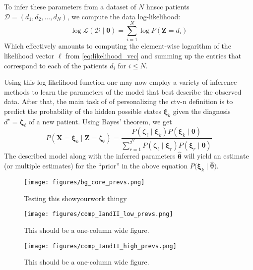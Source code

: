 \documentclass[twocolumn]{aastex631}
\begin{document}
To infer these parameters from a dataset of $N$ \gls{hnscc} patients $\boldsymbol{\mathcal{D}} = \left( d_1, d_2, \ldots, d_N \right)$, we compute the data log-likelihood:
%
\begin{equation}
    \log\mathcal{L} \left( \boldsymbol{\mathcal{D}} \mid \boldsymbol{\theta} \right) = \sum_{i=1}^N \log P \left( \mathbf{Z} = d_i \right)
\end{equation}
%
Which effectively amounts to computing the element-wise logarithm of the likelihood vector $\boldsymbol{\ell}$ from \cref{eq:likelihood_vec} and summing up the entries that correspond to each of the patients $d_i$ for $i\leq N$. 

Using this log-likelihood function one may now employ a variety of inference methods to learn the parameters of the model that best describe the observed data. After that, the main task of of personalizing the \gls{ctv-n} definition is to predict the probability of the hidden possible states $\boldsymbol{\xi}_k$ given the diagnosis $d^\star=\boldsymbol{\zeta}_\ell$ of a new patient. Using Bayes' theorem, we get
%
\begin{equation}
    P\left( \mathbf{X}=\boldsymbol{\xi}_k \mid \mathbf{Z}=\boldsymbol{\zeta}_\ell \right) = \frac{P\left( \boldsymbol{\zeta}_\ell \mid \boldsymbol{\xi}_k \right) P\left( \boldsymbol{\xi}_k \mid \boldsymbol{\theta} \right)}{\sum_{r=1}^{2^V} P\left( \boldsymbol{\zeta}_\ell \mid \boldsymbol{\xi}_r \right) P\left( \boldsymbol{\xi}_r \mid \boldsymbol{\theta} \right) }
\end{equation}
%
The described model along with the inferred parameters $\boldsymbol{\hat{\theta}}$ will yield an estimate (or multiple estimates) for the ``prior'' in the above equation $P\big( \boldsymbol{\xi}_k \mid \boldsymbol{\hat{\theta}} \big)$.

\begin{figure*}
    \begin{centering}
        \texttt{[image: figures/bg\_core\_prevs.png]}
        \caption{Testing this showyourwork thingy}
        \label{fig:bg_prevalences}
    \end{centering}
\end{figure*}

\begin{figure}
    \begin{centering}
        \texttt{[image: figures/comp\_IandII\_low\_prevs.png]}
        \caption{This should be a one-column wide figure.}
        \label{fig:IandII_low_prevs}
    \end{centering}
\end{figure}

\begin{figure}
    \begin{centering}
        \texttt{[image: figures/comp\_IandII\_high\_prevs.png]}
        \caption{This should be a one-column wide figure.}
        \label{fig:IandII_high_prevs}
    \end{centering}
\end{figure}


\end{document}
